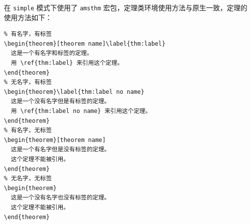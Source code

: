 \documentclass[lang=cn,newtx,10pt,scheme=chinese]{elegantbook}
\begin{document}
在 \lstinline{simple} 模式下使用了 \lstinline{amsthm} 宏包，定理类环境使用方法与原生一致，定理的使用方法如下：

\begin{lstlisting}
% 有名字，有标签
\begin{theorem}[theorem name]\label{thm:label}
  这是一个有名字和标签的定理。
  用 \ref{thm:label} 来引用这个定理。
\end{theorem}
% 无名字，有标签
\begin{theorem}\label{thm:label no name}
  这是一个没有名字但是有标签的定理。
  用 \ref{thm:label no name} 来引用这个定理。
\end{theorem}
% 有名字，无标签
\begin{theorem}[theorem name]
  这是一个有名字但是没有标签的定理。
  这个定理不能被引用。
\end{theorem}
% 无名字，无标签
\begin{theorem}
  这是一个没有名字也没有标签的定理。
  这个定理不能被引用。
\end{theorem}
\end{lstlisting}


\end{document}
